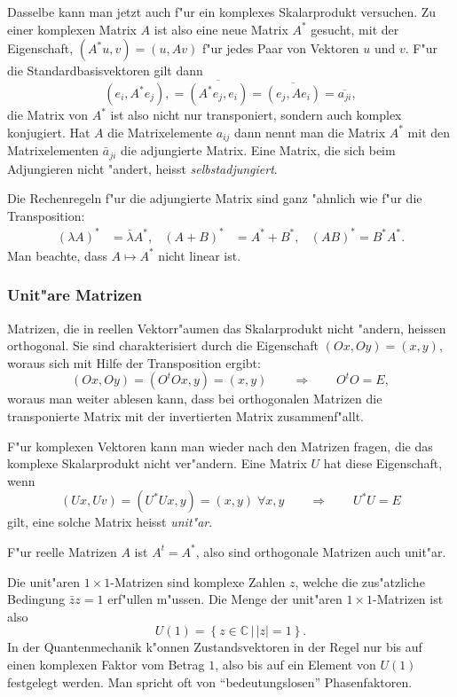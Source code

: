 Dasselbe kann man jetzt auch f"ur ein komplexes Skalarprodukt
versuchen. Zu einer komplexen Matrix $A$ ist also eine neue
Matrix $A^*$ gesucht, mit der Eigenschaft, $(A^*u,v)=(u,Av)$ f"ur 
jedes Paar von Vektoren $u$ und $v$. F"ur die Standardbasisvektoren
gilt dann
\[
(e_i,A^*e_j),
=
\overline{(A^*e_j, e_i)}
=
\overline{(e_j,Ae_i)}=\overline{a_{ji}},
\]
die Matrix von $A^*$ ist also nicht nur transponiert, sondern auch komplex
konjugiert. Hat $A$ die Ma\-trix\-e\-le\-men\-te $a_{ij}$ dann nennt man
die Matrix $A^*$ mit den Matrixelementen $\bar a_{ji}$ die
adjungierte Matrix. Eine Matrix, die sich beim Adjungieren nicht
"andert, heisst {\em selbstadjungiert}.

Die Rechenregeln f"ur die adjungierte Matrix sind ganz "ahnlich wie
f"ur die Transposition:
%
\[
\begin{aligned}
(\lambda A)^*&=\bar\lambda A^*,
&
(A+B)^*&=A^*+B^*,
&
(AB)^*=B^*A^*.
\end{aligned}
\]
Man beachte, dass $A\mapsto A^*$ nicht linear ist.

\subsubsection{Unit"are Matrizen}
Matrizen, die in reellen Vektorr"aumen das Skalarprodukt nicht "andern,
heissen orthogonal. Sie sind charakterisiert durch die Eigenschaft
%
%
$(Ox,Oy)=(x,y)$, woraus sich mit Hilfe der Transposition ergibt:
\[
(Ox,Oy)=(O^tOx,y)=(x,y)\qquad\Rightarrow\qquad O^tO=E,
\]
woraus man weiter ablesen kann, dass bei orthogonalen Matrizen
die transponierte Matrix mit der invertierten Matrix zusammenf"allt.

F"ur komplexen Vektoren kann man wieder nach den Matrizen fragen, die das
komplexe Skalarprodukt nicht ver"andern. Eine Matrix $U$ hat diese
Eigenschaft, wenn
\[
(Ux,Uv)=(U^*Ux,y)=(x,y)\;\forall x,y
\qquad\Rightarrow\qquad
U^*U=E
\]
gilt,
eine solche Matrix heisst {\em unit"ar}. 

F"ur reelle Matrizen $A$ ist $A^t=A^*$, also sind orthogonale Matrizen
auch unit"ar.

\begin{beispiel}
Die unit"aren $1\times 1$-Matrizen sind komplexe Zahlen $z$, welche
die zus"atzliche Bedingung $\bar zz=1$ erf"ullen m"ussen.
Die Menge der unit"aren $1\times 1$-Matrizen ist also
\[
U(1)=\left\{ z\in\mathbb C\,|\, |z|=1
\right\}.
\]
In der Quantenmechanik k"onnen Zustandsvektoren in der Regel nur bis auf
einen komplexen Faktor vom Betrag $1$, also bis auf ein Element
von $U(1)$ festgelegt werden.
Man spricht oft von ``bedeutungslosen'' Phasenfaktoren.
\end{beispiel}

